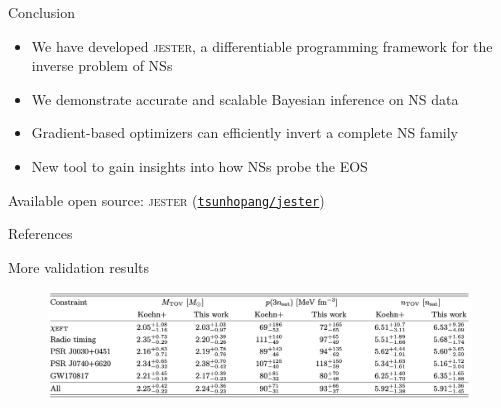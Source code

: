 \documentclass[usenames,dvipsnames,t]{beamer}
\begin{document}
\begin{frame}{Conclusion}

  \def\x{5mm}
  \def\y{7mm}

  \begin{itemize}
    \item We have developed \textsc{jester}, a differentiable programming framework for the inverse problem of NSs

    \vspace{\x}

    \item We demonstrate accurate and scalable Bayesian inference on NS data

    \vspace{\x}

    \item Gradient-based optimizers can efficiently invert a complete NS family

    \vspace{\x}

    \item New tool to gain insights into how NSs probe the EOS
  \end{itemize}

  \vspace{\y}

  Available open source: \textsc{jester} (\href{https://github.com/tsunhopang/jester}{{\faGithub \texttt{tsunhopang/jester}}})
\end{frame}

\begin{frame}[allowframebreaks]{References}
  \printbibliography
\end{frame}

\appendix

\begin{frame}{More validation results}


  \begin{figure}
    \centering
    \includegraphics[width=\linewidth]{Figures/Untitled.jpg}
  \end{figure}
\end{frame}
\end{document}
